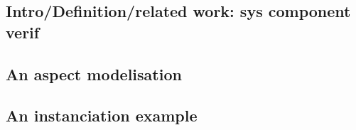 \subsection{Intro/Definition/related work: sys component verif}
\subsection{An aspect modelisation}
\subsection{An instanciation example}